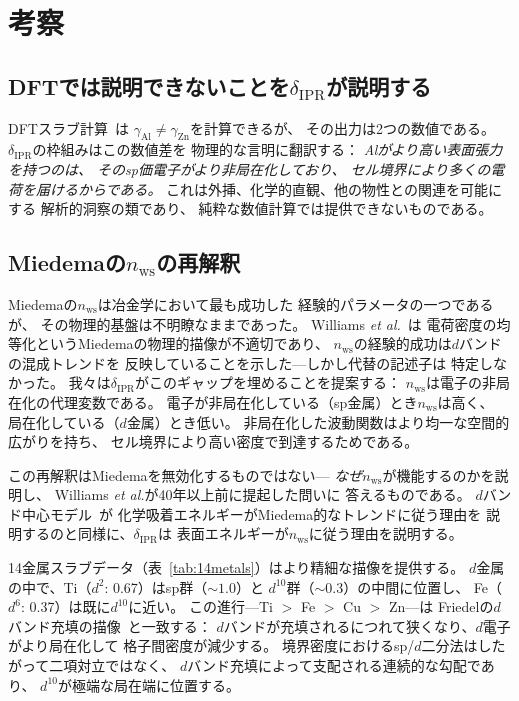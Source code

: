 \documentclass[twocolumn,showpacs,preprintnumbers,amsmath,amssymb,prb]{revtex4-2}
\begin{document}
\section{考察}
\label{sec:discussion}

\subsection{DFTでは説明できないことを$\delta_\mathrm{IPR}$が説明する}

DFTスラブ計算~\cite{Vitos1998,Tran2016}は
$\gamma_\mathrm{Al} \neq \gamma_\mathrm{Zn}$を計算できるが、
その出力は2つの数値である。
$\delta_\mathrm{IPR}$の枠組みはこの数値差を
物理的な言明に翻訳する：
\emph{Alがより高い表面張力を持つのは、
そのsp価電子がより非局在化しており、
セル境界により多くの電荷を届けるからである。}
これは外挿、化学的直観、他の物性との関連を可能にする
解析的洞察の類であり、
純粋な数値計算では提供できないものである。

\subsection{Miedemaの$n_\mathrm{ws}$の再解釈}

Miedemaの$n_\mathrm{ws}$は冶金学において最も成功した
経験的パラメータの一つであるが、
その物理的基盤は不明瞭なままであった。
Williams \textit{et al.}~\cite{WilliamsGelattMoruzzi1980}は
電荷密度の均等化というMiedemaの物理的描像が不適切であり、
$n_\mathrm{ws}$の経験的成功は$d$バンドの混成トレンドを
反映していることを示した---しかし代替の記述子は
特定しなかった。
我々は$\delta_\mathrm{IPR}$がこのギャップを埋めることを提案する：
$n_\mathrm{ws}$は電子の非局在化の代理変数である。
電子が非局在化している（sp金属）とき$n_\mathrm{ws}$は高く、
局在化している（$d$金属）とき低い。
非局在化した波動関数はより均一な空間的広がりを持ち、
セル境界により高い密度で到達するためである。

この再解釈はMiedemaを無効化するものではない---
\emph{なぜ}$n_\mathrm{ws}$が機能するのかを説明し、
Williams \textit{et al.}が40年以上前に提起した問いに
答えるものである。
$d$バンド中心モデル~\cite{Hammer1995}が
化学吸着エネルギーがMiedema的なトレンドに従う理由を
説明するのと同様に、$\delta_\mathrm{IPR}$は
表面エネルギーが$n_\mathrm{ws}$に従う理由を説明する。

14金属スラブデータ（表~\ref{tab:14metals}）はより精細な描像を提供する。
$d$金属の中で、Ti（$d^2$: 0.67）はsp群（$\sim\!1.0$）と
$d^{10}$群（$\sim\!0.3$）の中間に位置し、
Fe（$d^6$: 0.37）は既に$d^{10}$に近い。
この進行---Ti $>$ Fe $>$ Cu $>$ Zn---は
Friedelの$d$バンド充填の描像~\cite{Friedel1969}と一致する：
$d$バンドが充填されるにつれて狭くなり、$d$電子がより局在化して
格子間密度が減少する。
境界密度におけるsp/$d$二分法はしたがって二項対立ではなく、
$d$バンド充填によって支配される連続的な勾配であり、
$d^{10}$が極端な局在端に位置する。
\end{document}
